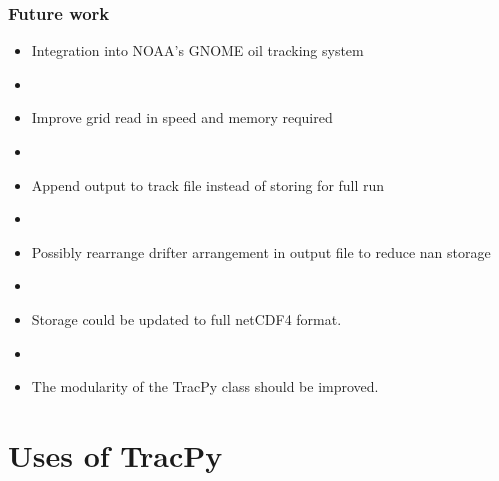 \documentclass[ignorenonframetext]{beamer}
\begin{document}
\begin{frame}[t]\frametitle{Future work}
\begin{itemize}
	\item {\Large Integration into NOAA's GNOME oil tracking system}
	\item[] ~
	\item {\Large Improve grid read in speed and memory required}
	\item[] ~
	\item {\Large Append output to track file instead of storing for full run}
	\item[] ~
	\item {\Large Possibly rearrange drifter arrangement in output file to reduce nan storage}
	\item[] ~
	\item {\Large Storage could be updated to full netCDF4 format.}
	\item[] ~
	\item {\Large The modularity of the TracPy class should be improved.}
\end{itemize}
\end{frame}


\section{Uses of TracPy}
\end{document}
